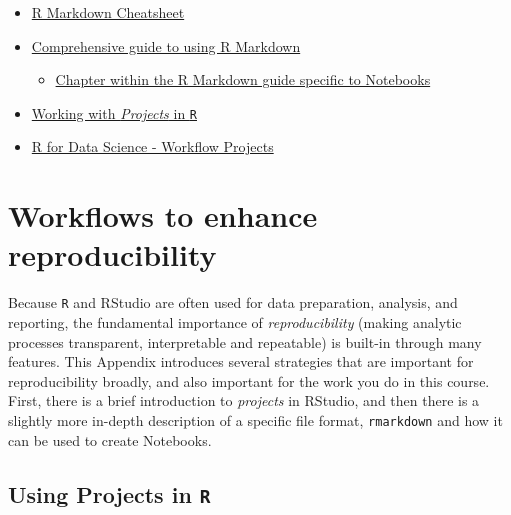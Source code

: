 \documentclass[
]{book}
\newcommand{\passthrough}[1]{#1}
\providecommand{\tightlist}{%
  \setlength{\itemsep}{0pt}\setlength{\parskip}{0pt}}
\begin{document}
\begin{itemize}
\tightlist
\item
  \href{https://rstudio.com/wp-content/uploads/2015/02/rmarkdown-cheatsheet.pdf}{R Markdown Cheatsheet}
\item
  \href{https://bookdown.org/yihui/rmarkdown/}{Comprehensive guide to using R Markdown}

  \begin{itemize}
  \tightlist
  \item
    \href{https://bookdown.org/yihui/rmarkdown/notebook.html}{Chapter within the R Markdown guide specific to Notebooks}
  \end{itemize}
\item
  \href{https://support.rstudio.com/hc/en-us/articles/200526207-Using-Projects}{Working with \emph{Projects} in \passthrough{\lstinline!R!}}
\item
  \href{https://r4ds.had.co.nz/workflow-projects.html}{R for Data Science - Workflow Projects}
\end{itemize}

\hypertarget{workflows-to-enhance-reproducibility}{%
\section*{Workflows to enhance reproducibility}\label{workflows-to-enhance-reproducibility}}

Because \passthrough{\lstinline!R!} and RStudio are often used for data preparation, analysis, and reporting, the fundamental importance of \emph{reproducibility} (making analytic processes transparent, interpretable and repeatable) is built-in through many features. This Appendix introduces several strategies that are important for reproducibility broadly, and also important for the work you do in this course. First, there is a brief introduction to \emph{projects} in RStudio, and then there is a slightly more in-depth description of a specific file format, \passthrough{\lstinline!rmarkdown!} and how it can be used to create Notebooks.

\hypertarget{using-projects-in-r}{%
\subsection*{\texorpdfstring{Using Projects in \texttt{R}}{Using Projects in R}}\label{using-projects-in-r}}
\end{document}
